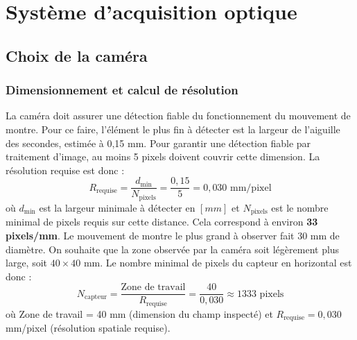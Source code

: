 \section{Système d'acquisition optique}
\subsection{Choix de la caméra}
\subsubsection{Dimensionnement et calcul de résolution}
La caméra doit assurer une détection fiable du fonctionnement du mouvement de montre. 
Pour ce faire, l'élément le plus fin à détecter est la largeur de l'aiguille des secondes, estimée à 0,15 mm. 
Pour garantir une détection fiable par traitement d'image, au moins 5 pixels doivent couvrir cette dimension.
La résolution requise est donc :
\begin{equation}
    R_{\text{requise}} = \frac{d_{\text{min}}}{N_{\text{pixels}}} = \frac{0,15}{5} = 0,030 \text{ mm/pixel}
    \label{eq:resolution_spatiale}
\end{equation}
\noindent où $d_{\text{min}}$ est la largeur minimale à détecter en $[mm]$ et $N_{\text{pixels}}$ est le nombre minimal de pixels requis sur cette distance.
Cela correspond à environ \textbf{33 pixels/mm}. 
Le mouvement de montre le plus grand à observer fait $30$ mm de diamètre. 
On souhaite que la zone observée par la caméra soit légèrement plus large, soit $40 \times 40$ mm. 
Le nombre minimal de pixels du capteur en horizontal est donc :
\begin{equation}
    N_{\text{capteur}} = \frac{\text{Zone de travail}}{R_{\text{requise}}} = \frac{40}{0,030} \approx 1333 \text{ pixels}
    \label{eq:resolution_capteur}
\end{equation}
\noindent où Zone de travail = 40 mm (dimension du champ inspecté) et $R_{\text{requise}} = 0,030$ mm/pixel (résolution spatiale requise).
